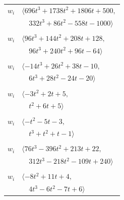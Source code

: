 \documentclass[11pt]{article}
\begin{document}
\begin{longtable}{@{}ll@{}}
$w_i$ & $\langle 696t^{3}+1738t^{2}+1806t+500,$\\
 & $\quad 332t^{3}+86t^{2}-558t-1000\rangle$\\
\addlinespace[2pt]
\multicolumn{2}{@{}p{0.97\textwidth}@{}}{$i=16$, $D_i=2$, $e_i=2$, $\rho_{ij}$: $15{:}2, \allowbreak 23{:}3, \allowbreak 31{:}3, \allowbreak 32{:}2, \allowbreak 48{:}3$}\\
$w_i$ & $\langle 96t^{3}+144t^{2}+208t+128,$\\
 & $\quad 96t^{3}+240t^{2}+96t-64\rangle$\\
\addlinespace[2pt]
\multicolumn{2}{@{}p{0.97\textwidth}@{}}{$i=17$, $D_i=1$, $\rho_{ij}$: $6{:}3, \allowbreak 21{:}3, \allowbreak 23{:}2, \allowbreak 29{:}2, \allowbreak 34{:}2, \allowbreak 39{:}3, \allowbreak 41{:}2$}\\
$w_i$ & $\langle -14t^{3}+26t^{2}+38t-10,$\\
 & $\quad 6t^{3}+28t^{2}-24t-20\rangle$\\
\addlinespace[2pt]
\multicolumn{2}{@{}p{0.97\textwidth}@{}}{$i=18$, $D_i=1$, $\rho_{ij}$: $5{:}3, \allowbreak 6{:}1, \allowbreak 25{:}1, \allowbreak 50{:}3$}\\
$w_i$ & $\langle -3t^{2}+2t+5,$\\
 & $\quad t^{2}+6t+5\rangle$\\
\addlinespace[2pt]
\multicolumn{2}{@{}p{0.97\textwidth}@{}}{$i=19$, $D_i=1$, $\rho_{ij}$: $5{:}2, \allowbreak 21{:}2, \allowbreak 44{:}2, \allowbreak 48{:}2$}\\
$w_i$ & $\langle -t^{2}-5t-3,$\\
 & $\quad t^{3}+t^{2}+t-1\rangle$\\
\addlinespace[2pt]
\multicolumn{2}{@{}p{0.97\textwidth}@{}}{$i=20$, $D_i=1$, $\rho_{ij}$: $2{:}2, \allowbreak 12{:}2, \allowbreak 24{:}2, \allowbreak 25{:}2, \allowbreak 30{:}2, \allowbreak 33{:}3, \allowbreak 37{:}2, \allowbreak 41{:}2, \allowbreak 50{:}1, \allowbreak 53{:}2, \allowbreak 56{:}3$}\\
$w_i$ & $\langle 76t^{3}-396t^{2}+213t+22,$\\
 & $\quad 312t^{3}-218t^{2}-109t+240\rangle$\\
\addlinespace[2pt]
\multicolumn{2}{@{}p{0.97\textwidth}@{}}{$i=21$, $D_i=1$, $\rho_{ij}$: $6{:}3, \allowbreak 10{:}3, \allowbreak 17{:}1, \allowbreak 19{:}2, \allowbreak 24{:}1, \allowbreak 30{:}3, \allowbreak 45{:}2, \allowbreak 51{:}2, \allowbreak 56{:}2$}\\
$w_i$ & $\langle -8t^{2}+11t+4,$\\
 & $\quad 4t^{3}-6t^{2}-7t+6\rangle$\\

\end{longtable}
\end{document}

